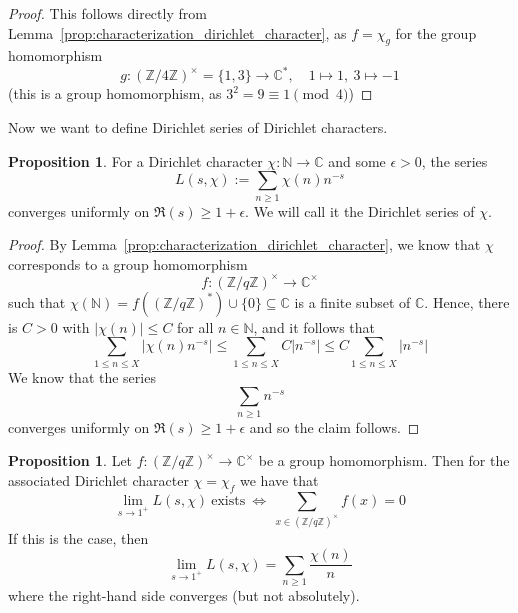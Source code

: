 \documentclass{scrartcl}
\newcommand{\N}{\mathbb{N}}
\newcommand{\Z}{\mathbb{Z}}
\newcommand{\C}{\mathbb{C}}
\newcommand{\units}{\times}
\theoremstyle{definition}
\newtheorem{proposition}[definition]{Proposition}
\begin{document}
\begin{proof}
    This follows directly from Lemma~\ref{prop:characterization_dirichlet_character}, as $f = \chi_g$ for the group homomorphism
    \begin{equation*}
        g: (\Z/4\Z)^\units = \{ 1, 3 \} \to \C^*, \quad 1 \mapsto 1, \ 3 \mapsto -1
    \end{equation*}
    (this is a group homomorphism, as $3^2 = 9 \equiv 1 \pmod 4$)
\end{proof}
Now we want to define Dirichlet series of Dirichlet characters.
\begin{proposition}
    For a Dirichlet character $\chi: \N \to \C$ and some $\epsilon > 0$, the series
    \begin{equation*}
        L(s, \chi) := \sum_{n \geq 1} \chi(n) n^{-s}
    \end{equation*}
    converges uniformly on $\Re(s) \geq 1 + \epsilon$.
    We will call it the Dirichlet series of $\chi$.
\end{proposition}
\begin{proof}
    By Lemma~\ref{prop:characterization_dirichlet_character}, we know that $\chi$ corresponds to a group homomorphism
    \begin{equation*}
        f: (\Z/q\Z)^\units \to \C^\units
    \end{equation*}
    such that $\chi(\N) = f((\Z/q\Z)^*) \cup \{ 0 \} \subseteq \C$ is a finite subset of $\C$.
    Hence, there is $C > 0$ with $|\chi(n)| \leq C$ for all $n \in \N$, and it follows that
    \begin{equation*}
        \sum_{1 \leq n \leq X} \left| \chi(n) n^{-s} \right| \leq \sum_{1 \leq n \leq X} C \left| n^{-s} \right| \leq C \sum_{1 \leq n \leq X} \left| n^{-s} \right|
    \end{equation*}
    We know that the series
    \begin{equation*}
        \sum_{n \geq 1} n^{-s}
    \end{equation*}
    converges uniformly on $\Re(s) \geq 1 + \epsilon$ and so the claim follows.
\end{proof}
\begin{proposition}
    \label{prop:dirichlet_series_at_one}
    Let $f: (\Z/q\Z)^\units \to \C^\units$ be a group homomorphism. Then for the associated Dirichlet character $\chi = \chi_f$ we have that
    \begin{equation*}
        \lim_{s \to 1^+} L(s, \chi) \ \text{exists} \ \Leftrightarrow \ \sum_{x \in (\Z/q\Z)^\units} f(x) = 0
    \end{equation*}
    If this is the case, then
    \begin{equation*}
        \lim_{s \to 1^+} L(s, \chi) = \sum_{n \geq 1} \frac {\chi(n)} n
    \end{equation*}
    where the right-hand side converges (but not absolutely).
\end{proposition}
\end{document}
